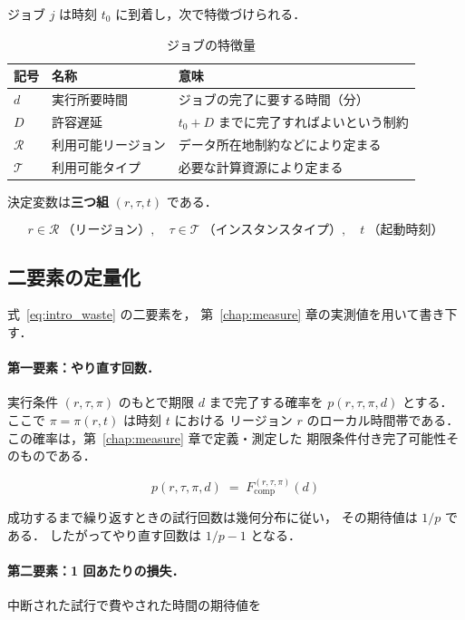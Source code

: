\documentclass[11pt,a4paper]{ltjsreport}
\newcommand{\Fcomp}{F_{\mathrm{comp}}}
\begin{document}
ジョブ $j$ は時刻 $t_0$ に到着し，次で特徴づけられる．

\begin{table}[htbp]
\centering
\caption{ジョブの特徴量}
\label{tab:job}
\small
\begin{tabularx}{\textwidth}{@{}llX@{}}
\toprule
記号 & 名称 & 意味 \\
\midrule
$d$ & 実行所要時間 & ジョブの完了に要する時間（分） \\
$D$ & 許容遅延 & $t_0 + D$ までに完了すればよいという制約 \\
$\mathcal{R}$ & 利用可能リージョン & データ所在地制約などにより定まる \\
$\mathcal{T}$ & 利用可能タイプ & 必要な計算資源により定まる \\
\bottomrule
\end{tabularx}
\end{table}

決定変数は\textbf{三つ組} $(r, \tau, t)$ である．

\begin{equation}
r \in \mathcal{R}\ \text{（リージョン）},\quad
\tau \in \mathcal{T}\ \text{（インスタンスタイプ）},\quad
t\ \text{（起動時刻）}
\end{equation}

\subsection{二要素の定量化}

式~\eqref{eq:intro_waste} の二要素を，
第~\ref{chap:measure} 章の実測値を用いて書き下す．

\paragraph{第一要素：やり直す回数．}
実行条件 $(r,\tau,\pi)$ のもとで期限 $d$ まで完了する確率を
$p(r,\tau,\pi,d)$ とする．
ここで $\pi = \pi(r,t)$ は時刻 $t$ における
リージョン $r$ のローカル時間帯である．
この確率は，第~\ref{chap:measure} 章で定義・測定した
期限条件付き完了可能性そのものである．

\begin{equation}
p(r,\tau,\pi,d) \;=\; \Fcomp^{(r,\tau,\pi)}(d)
\label{eq:p_is_fcomp}
\end{equation}

成功するまで繰り返すときの試行回数は幾何分布に従い，
その期待値は $1/p$ である．
したがってやり直す回数は $1/p - 1$ となる．

\paragraph{第二要素：1 回あたりの損失．}
中断された試行で費やされた時間の期待値を
\end{document}
